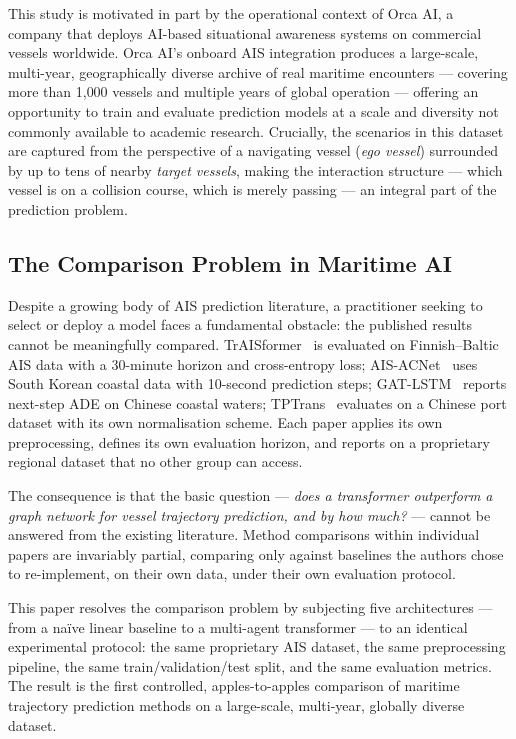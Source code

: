 \documentclass[12pt, a4paper]{article}
\begin{document}
  This study is motivated in part by the operational context of Orca AI, a company that
  deploys AI-based situational awareness systems on commercial vessels worldwide.
  Orca AI's onboard AIS integration produces a large-scale, multi-year, geographically
  diverse archive of real maritime encounters — covering more than 1{,}000 vessels and
  multiple years of global operation — offering an opportunity to train and evaluate
  prediction models at a scale and diversity not commonly available to academic research.
  Crucially, the scenarios in this dataset are captured from the perspective of a navigating
  vessel (\textit{ego vessel}) surrounded by up to tens of nearby \textit{target vessels},
  making the interaction structure — which vessel is on a collision course, which is merely
  passing — an integral part of the prediction problem.

  \subsection{The Comparison Problem in Maritime AI}

  Despite a growing body of AIS prediction literature, a practitioner seeking to select
  or deploy a model faces a fundamental obstacle: the published results cannot be
  meaningfully compared.  TrAISformer~\citep{nguyen2021traisformer} is evaluated on
  Finnish–Baltic AIS data with a 30-minute horizon and cross-entropy loss;
  AIS-ACNet~\citep{shin2024aisacnet} uses South Korean coastal data with 10-second
  prediction steps; GAT-LSTM~\citep{zhao2023gatlstm} reports next-step ADE on
  Chinese coastal waters; TPTrans~\citep{wang2024tptrans} evaluates on a Chinese
  port dataset with its own normalisation scheme.  Each paper applies its own
  preprocessing, defines its own evaluation horizon, and reports on a proprietary
  regional dataset that no other group can access.

  The consequence is that the basic question — \textit{does a transformer outperform a
  graph network for vessel trajectory prediction, and by how much?} — cannot be answered
  from the existing literature.  Method comparisons within individual papers are invariably
  partial, comparing only against baselines the authors chose to re-implement, on their
  own data, under their own evaluation protocol.

  This paper resolves the comparison problem by subjecting five architectures — from a
  na\"{i}ve linear baseline to a multi-agent transformer — to an identical experimental
  protocol: the same proprietary AIS dataset, the same preprocessing pipeline, the same
  train/validation/test split, and the same evaluation metrics.  The result is the first
  controlled, apples-to-apples comparison of maritime trajectory prediction methods on
  a large-scale, multi-year, globally diverse dataset.
\end{document}
